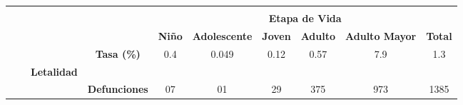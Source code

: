	\begin{tabular}{lccc|cccccc|}
		\cline{5-10}
		&
		\multicolumn{1}{l}{} &
		&
		&
		\multicolumn{6}{c|}{\cellcolor[HTML]{F4BFBF}} \\
		&
		\multicolumn{1}{l}{} &
		\multicolumn{1}{l}{} &
		\multicolumn{1}{l|}{} &
		\multicolumn{6}{c|}{\multirow{-2}{*}{\cellcolor[HTML]{F4BFBF}\textbf{Etapa de Vida}}} \\ \cline{5-10} 
		&
		\multicolumn{1}{l}{} &
		\multicolumn{1}{l}{} &
		\multicolumn{1}{l|}{} &
		\multicolumn{1}{c|}{\cellcolor[HTML]{F4BFBF}\textbf{Niño}} &
		\multicolumn{1}{l|}{\cellcolor[HTML]{F4BFBF}\textbf{Adolescente}} &
		\multicolumn{1}{l|}{\cellcolor[HTML]{F4BFBF}\textbf{Joven}} &
		\multicolumn{1}{l|}{\cellcolor[HTML]{F4BFBF}\textbf{Adulto}} &
		\multicolumn{1}{l|}{\cellcolor[HTML]{F4BFBF}\textbf{Adulto Mayor}} &
		\cellcolor[HTML]{F4BFBF}\textbf{Total} \\ \cline{2-10} 
		\multicolumn{1}{l|}{} &
		\multicolumn{1}{c|}{\cellcolor[HTML]{FFD9C0}} &
		\multicolumn{1}{c|}{\cellcolor[HTML]{FFD9C0}} &
		\cellcolor[HTML]{FFD9C0}\textbf{Tasa (\%)} &
		\multicolumn{1}{c|}{\cellcolor[HTML]{FFD9C0}0.4} &
		\multicolumn{1}{c|}{\cellcolor[HTML]{FFD9C0}0.049} &
		\multicolumn{1}{c|}{\cellcolor[HTML]{FFD9C0}0.12} &
		\multicolumn{1}{c|}{\cellcolor[HTML]{FFD9C0}0.57} &
		\multicolumn{1}{c|}{\cellcolor[HTML]{FFD9C0}7.9} &
		\cellcolor[HTML]{FFD9C0}1.3 \\ \cline{4-10} 
		\multicolumn{1}{l|}{} &
		\multicolumn{1}{c|}{\cellcolor[HTML]{FFD9C0}} &
		\multicolumn{1}{c|}{\multirow{-2}{*}{\cellcolor[HTML]{FFD9C0}\textbf{Letalidad}}} &
		\cellcolor[HTML]{FFD9C0} &
		\multicolumn{1}{c|}{\cellcolor[HTML]{FFD9C0}} &
		\multicolumn{1}{c|}{\cellcolor[HTML]{FFD9C0}} &
		\multicolumn{1}{c|}{\cellcolor[HTML]{FFD9C0}} &
		\multicolumn{1}{c|}{\cellcolor[HTML]{FFD9C0}} &
		\multicolumn{1}{c|}{\cellcolor[HTML]{FFD9C0}} &
		\cellcolor[HTML]{FFD9C0} \\ \cline{3-3}
		\multicolumn{1}{l|}{} &
		\multicolumn{1}{c|}{\cellcolor[HTML]{FFD9C0}} &
		\multicolumn{1}{c|}{\cellcolor[HTML]{FFD9C0}} &
		\multirow{-2}{*}{\cellcolor[HTML]{FFD9C0}\textbf{Defunciones}} &
		\multicolumn{1}{c|}{\multirow{-2}{*}{\cellcolor[HTML]{FFD9C0}07}} &
		\multicolumn{1}{c|}{\multirow{-2}{*}{\cellcolor[HTML]{FFD9C0}01}} &
		\multicolumn{1}{c|}{\multirow{-2}{*}{\cellcolor[HTML]{FFD9C0}29}} &
		\multicolumn{1}{c|}{\multirow{-2}{*}{\cellcolor[HTML]{FFD9C0}375}} &
		\multicolumn{1}{c|}{\multirow{-2}{*}{\cellcolor[HTML]{FFD9C0}973}} &
		\multirow{-2}{*}{\cellcolor[HTML]{FFD9C0}1385} \\ \cline{4-10} 

\end{tabular}
